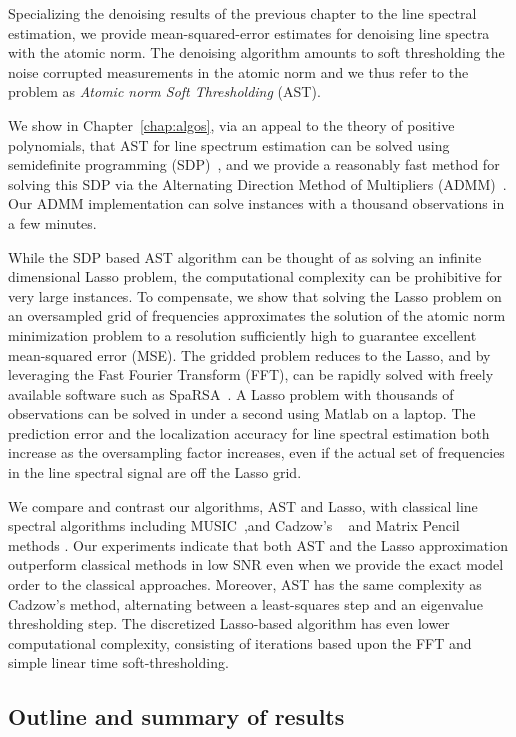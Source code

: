 Specializing the denoising results of the previous chapter to the line spectral
estimation, we provide mean-squared-error estimates for denoising line spectra
with the atomic norm. The denoising algorithm amounts to soft thresholding the
noise corrupted measurements in the atomic norm and we thus refer to the problem
as \emph{Atomic norm Soft Thresholding} (AST). 

We show in Chapter~\ref{chap:algos}, via an appeal to the theory of positive
polynomials, that AST for line spectrum estimation can be solved using
semidefinite programming (SDP)~\cite{Megretski03}, and we provide a reasonably
fast method for solving this SDP via the Alternating Direction Method of
Multipliers (ADMM)~\cite{BertsekasParallelBook,admm2011}. Our ADMM
implementation can solve instances with a thousand observations in a few
minutes.

While the SDP based AST algorithm can be thought of as solving an infinite
dimensional Lasso problem, the computational complexity can be prohibitive for
very large instances. To compensate, we show that solving the Lasso problem on
an oversampled grid of frequencies approximates the solution of the atomic norm
minimization problem to a resolution sufficiently high to guarantee excellent
mean-squared error (MSE). The gridded problem reduces to the Lasso, and by
leveraging the Fast Fourier Transform (FFT), can be rapidly solved with freely
available software such as SpaRSA~\cite{wright09}. A Lasso problem with
thousands of observations can be solved in under a second using Matlab on a
laptop. The prediction error and the localization accuracy for line spectral
estimation both increase as the oversampling factor increases, even if the
actual set of frequencies in the line spectral signal are off the Lasso grid.

We compare and contrast our algorithms, AST and Lasso, with classical line
spectral algorithms including MUSIC~\cite{music},and Cadzow's ~\cite{cadzow02}
and Matrix Pencil~\cite{hua02} methods . Our experiments indicate that both AST
and the Lasso approximation outperform classical methods in low SNR even when we
provide the exact model order to the classical approaches. Moreover, AST has the
same complexity as Cadzow's method, alternating between a least-squares step and
an eigenvalue thresholding step. The discretized Lasso-based algorithm has even
lower computational complexity, consisting of iterations based upon the FFT and
simple linear time soft-thresholding.

\subsection{Outline and summary of results} 

